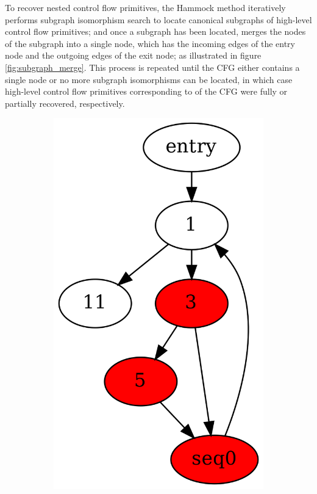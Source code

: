 To recover nested control flow primitives, the Hammock method iteratively performs subgraph isomorphism search to locate canonical subgraphs of high-level control flow primitives; and once a subgraph has been located, merges the nodes of the subgraph into a single node, which has the incoming edges of the entry node and the outgoing edges of the exit node; as illustrated in figure \ref{fig:subgraph_merge}. This process is repeated until the CFG either contains a single node or no more subgraph isomorphisms can be located, in which case high-level control flow primitives corresponding to of the CFG were fully or partially recovered, respectively.

\begin{figure}[htbp]
	\centering
	\begin{subfigure}[ht]{0.17\textwidth}
		\includegraphics[width=\textwidth]{inc/3_background/cfg_pre_merge.png}

\end{subfigure}
\end{figure}
